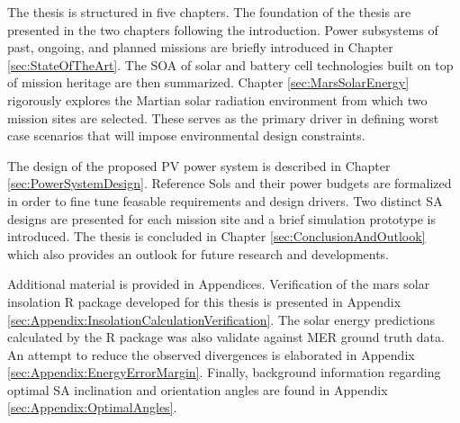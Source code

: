 The thesis is structured in five chapters. The foundation of the thesis are presented in the two chapters following the introduction. Power subsystems of past, ongoing, and planned missions are briefly introduced in Chapter \ref{sec:StateOfTheArt}. The \ac{SOA} of solar and battery cell technologies built on top of mission heritage are then summarized. Chapter \ref{sec:MarsSolarEnergy} rigorously explores the Martian solar radiation environment from which two mission sites are selected. These serves as the primary driver in defining worst case scenarios that will impose environmental design constraints.

The design of the proposed \ac{PV} power system is described in Chapter \ref{sec:PowerSystemDesign}. Reference Sols and their power budgets are formalized in order to fine tune feasable requirements and design drivers. Two distinct \ac{SA} designs are presented for each mission site and a brief simulation prototype is introduced. The thesis is concluded in Chapter \ref{sec:ConclusionAndOutlook} which also provides an outlook for future research and developments.

Additional material is provided in Appendices. Verification of the mars solar insolation R package developed for this thesis is presented in Appendix \ref{sec:Appendix:InsolationCalculationVerification}. The solar energy predictions calculated by the R package was also validate against \ac{MER} ground truth data. An attempt to reduce the observed divergences is elaborated in Appendix \ref{sec:Appendix:EnergyErrorMargin}. Finally, background information regarding optimal \ac{SA} inclination and orientation angles are found in Appendix \ref{sec:Appendix:OptimalAngles}.
